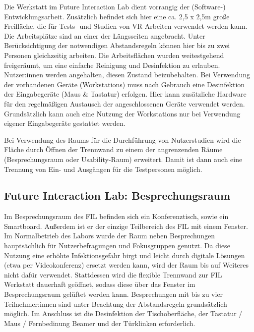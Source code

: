 
\noindent
Die Werkstatt im Future Interaction Lab dient vorrangig der (Software-) Entwicklungsarbeit.
Zusätzlich befindet sich hier eine ca.
2,5 x 2,5m große Freifläche, die für Tests- und Studien von VR-Arbeiten verwendet werden kann.
Die Arbeitsplätze sind an einer der Längsseiten angebracht. Unter Berücksichtigung der notwendigen Abstandsregeln können hier bis zu zwei Personen gleichzeitig arbeiten.
Die Arbeitsflächen wurden weitestgehend freigeräumt, um eine einfache Reinigung und Desinfektion zu erlauben.
Nutzer:innen werden angehalten, diesen Zustand beizubehalten.
Bei Verwendung der vorhandenen Geräte (Workstations) muss nach Gebrauch eine Desinfektion der Eingabegeräte (Maus \& Tastatur) erfolgen.
Hier kann zusätzliche Hardware für den regelmäßigen Austausch der angeschlossenen Geräte verwendet werden.
Grundsätzlich kann auch eine Nutzung der Workstations nur bei Verwendung eigener Eingabegeräte gestattet werden.

\medskip
\noindent
Bei Verwendung des Raums für die Durchführung von Nutzerstudien wird die Fläche durch Öffnen der Trennwand zu einem der angrenzenden Räume (Besprechungsraum oder Usability-Raum) erweitert.
Damit ist dann auch eine Trennung von Ein- und Ausgängen für die Testpersonen möglich.

\subsection{Future Interaction Lab: Besprechungsraum}\label{subsec:labore_fil_besprechungsraum}


\noindent
Im Besprechungsraum des FIL befinden sich ein Konferenztisch, sowie ein Smartboard.
Außerdem ist er der einzige Teilbereich des FIL mit einem Fenster.
Im Normalbetrieb des Labors wurde der Raum neben Besprechungen hauptsächlich für Nutzerbefragungen und Fokusgruppen genutzt.
Da diese Nutzung eine erhöhte Infektionsgefahr birgt und leicht durch digitale Lösungen (etwa per Videokonferenz) ersetzt werden kann, wird der Raum bis auf Weiteres nicht dafür verwendet.
Stattdessen wird die flexible Trennwand zur FIL Werkstatt dauerhaft geöffnet, sodass diese über das Fenster im Besprechungsraum gelüftet werden kann.
Besprechungen mit bis zu vier Teilnehmer:innen sind unter Beachtung der Abstandsregeln grundsätzlich möglich.
Im Anschluss ist die Desinfektion der Tischoberfläche, der Tastatur / Maus / Fernbedinung Beamer und der Türklinken erforderlich.

